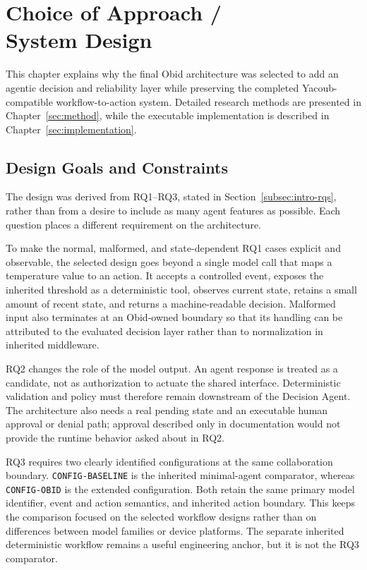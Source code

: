 \begingroup
\setlength{\emergencystretch}{2em}

\section[Choice of Approach / System Design]{Choice of Approach /\\System Design}\label{sec:system-design}

This chapter explains why the final Obid architecture was selected to add an
agentic decision and reliability layer while preserving the completed
Yacoub-compatible workflow-to-action system. Detailed research methods are
presented in Chapter~\ref{sec:method}, while the executable implementation is
described in Chapter~\ref{sec:implementation}.

\subsection{Design Goals and Constraints}\label{subsec:design-goals}

The design was derived from RQ1--RQ3, stated in
Section~\ref{subsec:intro-rqs}, rather than from a desire to include as many
agent features as possible. Each question places a different requirement on the
architecture.

To make the normal, malformed, and state-dependent RQ1 cases explicit and
observable, the selected design goes beyond a single model call that maps a
temperature value to an action. It accepts a controlled event, exposes the
inherited threshold as a deterministic tool, observes current state, retains a
small amount of recent state, and returns a machine-readable decision.
Malformed input also terminates at an Obid-owned boundary so that its
handling can be attributed to the evaluated decision layer rather than to
normalization in inherited middleware.

RQ2 changes the role of the model output. An agent response is treated as a
candidate, not as authorization to actuate the shared interface. Deterministic
validation and policy must therefore remain downstream of the Decision Agent.
The architecture also needs a real pending state and an executable human
approval or denial path; approval described only in documentation would not
provide the runtime behavior asked about in RQ2.

RQ3 requires two clearly identified configurations at the same collaboration
boundary. \texttt{CONFIG-BASELINE} is the inherited minimal-agent comparator,
whereas \texttt{CONFIG-OBID} is the extended configuration. Both retain the
same primary model identifier, event and action semantics, and inherited action
boundary. This keeps the comparison focused on the selected workflow designs
rather than on differences between model families or device platforms. The
separate inherited deterministic workflow remains a useful engineering anchor,
but it is not the RQ3 comparator.

